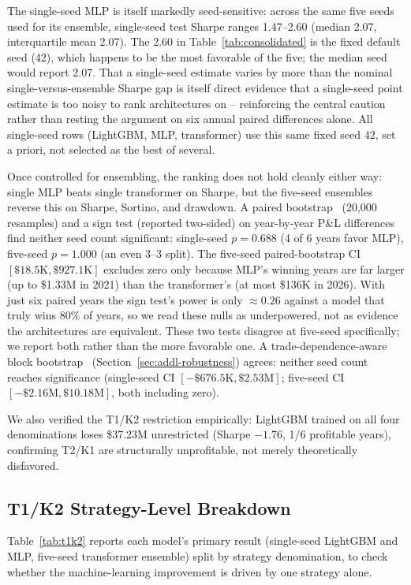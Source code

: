 \documentclass[sigconf,review]{acmart}
\begin{document}
The single-seed MLP is itself markedly seed-sensitive: across the same five seeds used for its ensemble, single-seed test Sharpe ranges 1.47--2.60 (median 2.07, interquartile mean 2.07). The 2.60 in Table~\ref{tab:consolidated} is the fixed default seed (42), which happens to be the most favorable of the five; the median seed would report 2.07. That a single-seed estimate varies by more than the nominal single-versus-ensemble Sharpe gap is itself direct evidence that a single-seed point estimate is too noisy to rank architectures on -- reinforcing the central caution rather than resting the argument on six annual paired differences alone. All single-seed rows (LightGBM, MLP, transformer) use this same fixed seed 42, set a priori, not selected as the best of several.

Once controlled for ensembling, the ranking does not hold cleanly either way: single MLP beats single transformer on Sharpe, but the five-seed ensembles reverse this on Sharpe, Sortino, and drawdown. A paired bootstrap~\cite{efron1993bootstrap} (20{,}000 resamples) and a sign test (reported two-sided) on year-by-year P\&L differences find neither seed count significant: single-seed $p=0.688$ (4 of 6 years favor MLP), five-seed $p=1.000$ (an even 3--3 split). The five-seed paired-bootstrap CI $[\$18.5\text{K}, \$927.1\text{K}]$ excludes zero only because MLP's winning years are far larger (up to \$1.33M in 2021) than the transformer's (at most \$136K in 2026). With just six paired years the sign test's power is only $\approx0.26$ against a model that truly wins 80\% of years, so we read these nulls as underpowered, not as evidence the architectures are equivalent. These two tests disagree at five-seed specifically; we report both rather than the more favorable one. A trade-dependence-aware block bootstrap~\cite{kunsch1989} (Section~\ref{sec:addl-robustness}) agrees: neither seed count reaches significance (single-seed CI $[-\$676.5\text{K}, \$2.53\text{M}]$; five-seed CI $[-\$2.16\text{M}, \$10.18\text{M}]$, both including zero).

We also verified the T1/K2 restriction empirically: LightGBM trained on all four denominations loses \$37.23M unrestricted (Sharpe $-1.76$, 1/6 profitable years), confirming T2/K1 are structurally unprofitable, not merely theoretically disfavored.

\subsection{T1/K2 Strategy-Level Breakdown}
\label{sec:t1k2breakdown}
Table~\ref{tab:t1k2} reports each model's primary result (single-seed LightGBM and MLP, five-seed transformer ensemble) split by strategy denomination, to check whether the machine-learning improvement is driven by one strategy alone.
\end{document}
